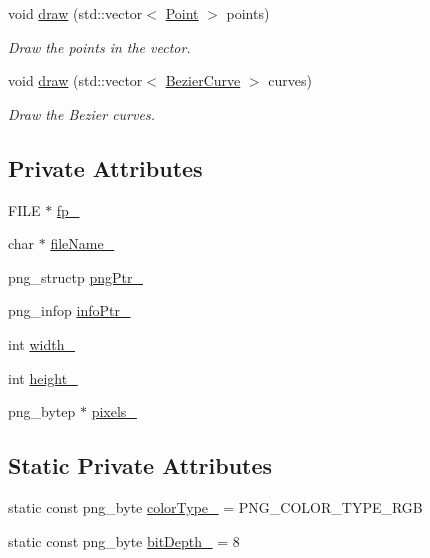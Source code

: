 \begin{DoxyCompactItemize}
void \mbox{\hyperlink{class_image_aecc7a0365eb204dba714a71bcb86361d}{draw}} (std\+::vector$<$ \mbox{\hyperlink{class_point}{Point}} $>$ points)
\begin{DoxyCompactList}\small\item\em Draw the points in the vector. \end{DoxyCompactList}\item 
void \mbox{\hyperlink{class_image_a6349aee8ec05bbecb9b6e6430de07d7c}{draw}} (std\+::vector$<$ \mbox{\hyperlink{class_bezier_curve}{Bezier\+Curve}} $>$ curves)
\begin{DoxyCompactList}\small\item\em Draw the Bezier curves. \end{DoxyCompactList}\end{DoxyCompactItemize}
\subsection*{Private Attributes}
\begin{DoxyCompactItemize}
\item 
F\+I\+LE $\ast$ \mbox{\hyperlink{class_image_a4d43b19efb469f7c9fb65e7202d7ba7f}{fp\+\_\+}}
\item 
char $\ast$ \mbox{\hyperlink{class_image_a1f1849b27396edcc169e7d717ef0e6ab}{file\+Name\+\_\+}}
\item 
png\+\_\+structp \mbox{\hyperlink{class_image_aaf607d2596bac09b13370599d9ba6d8c}{png\+Ptr\+\_\+}}
\item 
png\+\_\+infop \mbox{\hyperlink{class_image_a505878e5e19500e3cc1b940067faa584}{info\+Ptr\+\_\+}}
\item 
int \mbox{\hyperlink{class_image_a4c2d8a01ecf1b7438f57f93357080e08}{width\+\_\+}}
\item 
int \mbox{\hyperlink{class_image_a64a699c5bb8e8a18c6971a8032806dba}{height\+\_\+}}
\item 
png\+\_\+bytep $\ast$ \mbox{\hyperlink{class_image_a51351c8507499d09cb9667c20ef01faf}{pixels\+\_\+}}
\end{DoxyCompactItemize}
\subsection*{Static Private Attributes}
\begin{DoxyCompactItemize}
\item 
static const png\+\_\+byte \mbox{\hyperlink{class_image_a94b0dece808a9f06ebb6f4394e8e3048}{color\+Type\+\_\+}} = P\+N\+G\+\_\+\+C\+O\+L\+O\+R\+\_\+\+T\+Y\+P\+E\+\_\+\+R\+GB
\item 
static const png\+\_\+byte \mbox{\hyperlink{class_image_ae472f0390f64eb5d49f858ce95e09ce8}{bit\+Depth\+\_\+}} = 8
\end{DoxyCompactItemize}


